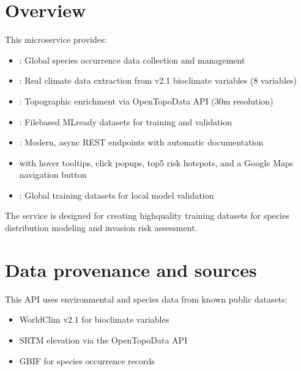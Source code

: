 \documentclass[letterpaper,10pt,english]{sphinxmanual}
\begin{document}
\chapter{Overview}
\label{\detokenize{index:overview}}
\sphinxAtStartPar
This microservice provides:
\begin{itemize}
\item {} 
\sphinxAtStartPar
{}: Global species occurrence data collection and management

\item {} 
\sphinxAtStartPar
{}: Real climate data extraction from v2.1 bioclimate variables (8 variables)

\item {} 
\sphinxAtStartPar
{}: Topographic enrichment via Open\sphinxhyphen{}Topo\sphinxhyphen{}Data API (30m resolution)

\item {} 
\sphinxAtStartPar
{}: File\sphinxhyphen{}based ML\sphinxhyphen{}ready datasets for training and validation

\item {} 
\sphinxAtStartPar
{}: Modern, async REST endpoints with automatic documentation

\item {} \begin{description}
\sphinxAtStartPar
with hover tooltips, click popups, top\sphinxhyphen{}5 risk hotspots, and a Google Maps navigation button

\end{description}

\item {} 
\sphinxAtStartPar
{}: Global training datasets for local model validation

\end{itemize}

\sphinxAtStartPar
The service is designed for creating high\sphinxhyphen{}quality training datasets for species distribution modeling and invasion risk assessment.


\chapter{Data provenance and sources}
\label{\detokenize{index:data-provenance-and-sources}}
\sphinxAtStartPar
This API uses environmental and species data from known public datasets:
\begin{itemize}
\item {} 
\sphinxAtStartPar
WorldClim v2.1 for bioclimate variables

\item {} 
\sphinxAtStartPar
SRTM elevation via the Open\sphinxhyphen{}Topo\sphinxhyphen{}Data API

\item {} 
\sphinxAtStartPar
GBIF for species occurrence records

\end{itemize}
\end{document}
